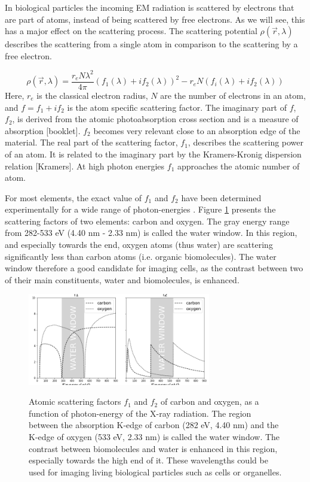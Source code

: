 In biological particles the incoming EM radiation is scattered by electrons that are part of atoms, instead of being scattered by free electrons. As we will see, this has a major effect on the scattering process. The scattering potential $\rho(\vec{r},\lambda)$ describes the scattering from a single atom in comparison to the scattering by a free electron.

\begin{equation}
\rho(\vec{r},\lambda) = \frac{r_e N \lambda^2}{4 \pi} (f_1(\lambda)+i f_2(\lambda))^2 - r_e N (f_i(\lambda)+i f_2(\lambda) ) 
\end{equation}
Here, $r_e$ is the classical electron radius, $N$ are the number of electrons in an atom, and $f = f_1+ i f_2$ is the atom specific scattering factor. The imaginary part of $f$, $f_2$, is derived from the atomic photoabsorption cross section and is a measure of absorption [booklet]. $f_2$ becomes very relevant close to an absorption edge of the material. The real part of the scattering factor, $f_1$, describes the scattering power of an atom. It is related to the imaginary part by the Kramers-Kronig dispersion relation [Kramers]. At high photon energies $f_1$ approaches the atomic number of atom.  

For most elements, the exact value of $f_1$ and $f_2$ have been determined experimentally for a wide range of photon-energies \cite{Henke1990}. Figure \ref{fig:waterwindow} presents the scattering factors of two elements: carbon and oxygen. The gray energy range from 282-533 eV (4.40 nm - 2.33 nm) is called the water window. In this region, and especially towards the end, oxygen atoms (thus water) are scattering significantly less than carbon atoms (i.e. organic biomolecules). The water window therefore a good candidate for imaging cells, as the contrast between two of their main constituents, water and biomolecules, is enhanced.

\begin{figure}[h]
\centering 
\includegraphics[width=80mm]{waterwindow.png}
\label{fig:waterwindow}
\caption{Atomic scattering factors $f_1$ and $f_2$ of carbon and oxygen, as a function of photon-energy of the X-ray radiation. The region between the absorption K-edge of carbon (282 eV, 4.40 nm) and the K-edge of oxygen (533 eV, 2.33 nm) is called the water window.  The contrast between biomolecules and water is enhanced in this region, especially towards the high end of it. These wavelengths could be used for imaging living biological particles such as cells or organelles.}
\end{figure}

